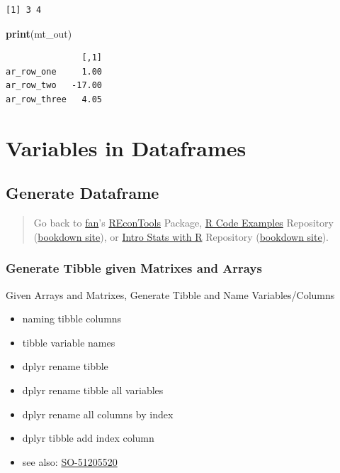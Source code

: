 \documentclass[
]{book}
\newenvironment{Shaded}{\begin{snugshade}}{\end{snugshade}}
\newcommand{\KeywordTok}[1]{\textcolor[rgb]{0.13,0.29,0.53}{\textbf{#1}}}
\newcommand{\NormalTok}[1]{#1}
\providecommand{\tightlist}{%
  \setlength{\itemsep}{0pt}\setlength{\parskip}{0pt}}
\begin{document}
\begin{verbatim}
[1] 3 4
\end{verbatim}

\begin{Shaded}
\begin{Highlighting}[]
\KeywordTok{print}\NormalTok{(mt_out)}
\end{Highlighting}
\end{Shaded}

\begin{verbatim}
               [,1]
ar_row_one     1.00
ar_row_two   -17.00
ar_row_three   4.05
\end{verbatim}

\hypertarget{variables-in-dataframes}{%
\section{Variables in Dataframes}\label{variables-in-dataframes}}

\hypertarget{generate-dataframe}{%
\subsection{Generate Dataframe}\label{generate-dataframe}}

\begin{quote}
Go back to \href{http://fanwangecon.github.io/}{fan}'s \href{https://fanwangecon.github.io/REconTools/}{REconTools} Package, \href{https://fanwangecon.github.io/R4Econ/}{R Code Examples} Repository (\href{https://fanwangecon.github.io/R4Econ/bookdown}{bookdown site}), or \href{https://fanwangecon.github.io/Stat4Econ/}{Intro Stats with R} Repository (\href{https://fanwangecon.github.io/Stat4Econ/bookdown}{bookdown site}).
\end{quote}

\hypertarget{generate-tibble-given-matrixes-and-arrays}{%
\subsubsection{Generate Tibble given Matrixes and Arrays}\label{generate-tibble-given-matrixes-and-arrays}}

Given Arrays and Matrixes, Generate Tibble and Name Variables/Columns

\begin{itemize}
\tightlist
\item
  naming tibble columns
\item
  tibble variable names
\item
  dplyr rename tibble
\item
  dplyr rename tibble all variables
\item
  dplyr rename all columns by index
\item
  dplyr tibble add index column
\item
  see also: \href{https://stackoverflow.com/questions/45535157/difference-between-dplyrrename-and-dplyrrename-all}{SO-51205520}
\end{itemize}
\end{document}
